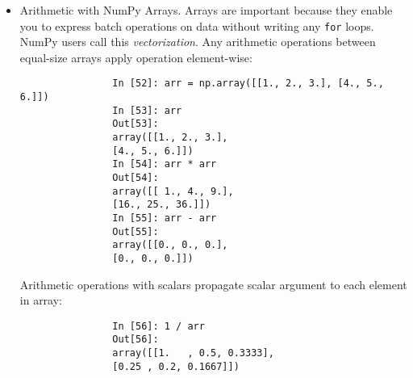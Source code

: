 \documentclass{article}
\newtheorem{remark}{Remark}
\begin{document}
\begin{itemize}
\begin{itemize}
\begin{itemize}
			Can also use another array's {\tt dtype} attribute:
			\begin{verbatim}
				In [47]: int_array = np.arange(10)
				In [48]: calibers = np.array([.22, .270, .357, .380, .44, .50], dtype=np.float64)
				In [49]: int_array.astype(calibers.dtype)
				Out[49]: array([0., 1., 2., 3., 4., 5., 6., 7., 8., 9.])
			\end{verbatim}
			There are shorthand type code strings you can also use to refer to a {\tt dtype}:
			\begin{verbatim}
				In [50]: zeros_uint32 = np.zeros(8, dtype="u4")
				In [51]: zeros_uint32
				Out[51]: array([0, 0, 0, 0, 0, 0, 0, 0], dtype=uint32)
			\end{verbatim}
			
			\begin{remark}
				Call {\tt astype} \emph{always} creates a new array (a copy of data), even if new data type is same as old data type.
			\end{remark}
			\item {\sf Arithmetic with NumPy Arrays.} Arrays are important because they enable you to express batch operations on data without writing any {\tt for} loops. NumPy users call this {\it vectorization}. Any arithmetic operations between equal-size arrays apply operation element-wise:
			\begin{verbatim}
				In [52]: arr = np.array([[1., 2., 3.], [4., 5., 6.]])
				In [53]: arr
				Out[53]:
				array([[1., 2., 3.],
				[4., 5., 6.]])
				In [54]: arr * arr
				Out[54]:
				array([[ 1., 4., 9.],
				[16., 25., 36.]])
				In [55]: arr - arr
				Out[55]:
				array([[0., 0., 0.],
				[0., 0., 0.]])
			\end{verbatim}
			Arithmetic operations with scalars propagate scalar argument to each element in array:
			\begin{verbatim}
				In [56]: 1 / arr
				Out[56]:
				array([[1.   , 0.5, 0.3333],
				[0.25 , 0.2, 0.1667]])
				

\end{verbatim}
\end{itemize}
\end{itemize}
\end{itemize}
\end{document}
